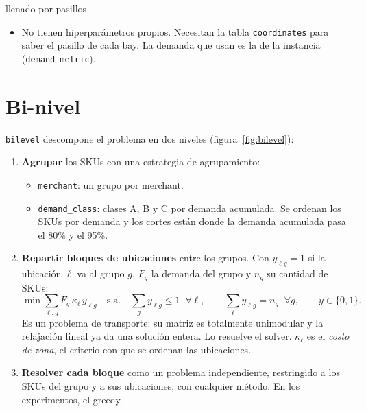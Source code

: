 \documentclass[11pt,a4paper,oneside]{report}
\newcommand{\code}[1]{\texttt{\small #1}}
\begin{document}
\begin{hiper}{llenado por pasillos}
\begin{itemize}
  \item No tienen hiperparámetros propios. Necesitan la tabla \code{coordinates} para saber
        el pasillo de cada bay. La demanda que usan es la de la instancia
        (\code{demand\_metric}).
\end{itemize}
\end{hiper}

\section{Bi-nivel}
\label{sec:bilevel}

\code{bilevel} descompone el problema en dos niveles (figura~\ref{fig:bilevel}):

\begin{enumerate}
  \item \textbf{Agrupar} los SKUs con una estrategia de agrupamiento:
        \begin{itemize}
          \item \code{merchant}: un grupo por merchant.
          \item \code{demand\_class}: clases A, B y C por demanda acumulada. Se ordenan los
                SKUs por demanda y los cortes están donde la demanda acumulada pasa el 80\% y
                el 95\%.
        \end{itemize}
  \item \textbf{Repartir bloques de ubicaciones} entre los grupos. Con $y_{\ell g} = 1$ si la
        ubicación $\ell$ va al grupo $g$, $F_g$ la demanda del grupo y $n_g$ su cantidad de
        SKUs:
        \[
        \min \sum_{\ell, g} F_g\, \kappa_\ell\, y_{\ell g} \quad \text{s.a.} \quad
        \sum_g y_{\ell g} \le 1 \;\; \forall \ell, \qquad
        \sum_\ell y_{\ell g} = n_g \;\; \forall g, \qquad y \in \{0,1\}.
        \]
        Es un problema de transporte: su matriz es totalmente unimodular y la relajación
        lineal ya da una solución entera. Lo resuelve el solver. $\kappa_\ell$ es el
        \emph{costo de zona}, el criterio con que se ordenan las ubicaciones.
  \item \textbf{Resolver cada bloque} como un problema independiente, restringido a los SKUs
        del grupo y a sus ubicaciones, con cualquier método. En los experimentos, el greedy.
\end{enumerate}
\end{document}
